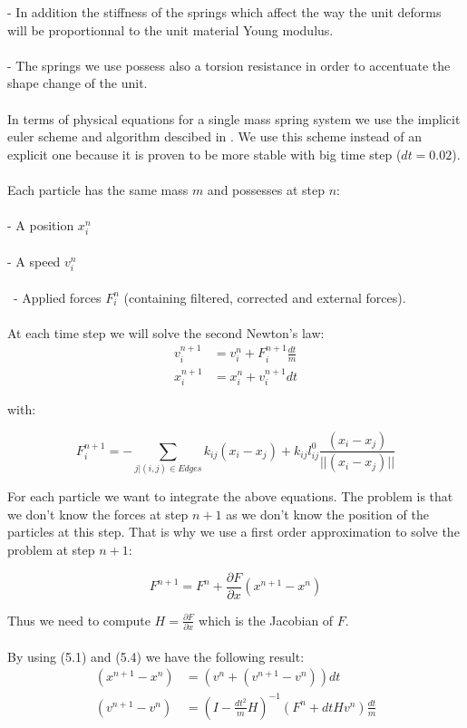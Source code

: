 \documentclass[12pt, a4paper]{report} %
\begin{document}
	\indent	- In addition the stiffness of the springs which affect the way the unit deforms will be proportionnal to the unit material Young modulus. \\\\
\indent	- The springs we use possess also a torsion resistance in order to accentuate the shape change of the unit.\\\\
In terms of physical equations for a single mass spring system we use the implicit euler scheme and algorithm descibed in \cite{caltech}. We use this scheme instead of an explicit one because it is proven to be more stable with big time step ($dt = 0.02$).\\\\ 
Each particle has the same mass $m$ and possesses at step $n$:\\\\
\indent	- A position  $x_i^n$\\\\
\indent	- A speed $v_i^n$ \\\\\
\indent	- Applied forces $F_i^n$ (containing filtered, corrected and external forces).\\\\
At each time step we will solve the second Newton's law:\\

\begin{align}
	v_i^{n+1} &= v_i^n + F_i^{n+1} \frac{dt}{m}\\
	x_i^{n+1} &= x_i^n + v_i^{n+1} dt 
\end{align}

with:

\begin{equation}
F_i^{n+1} = - \sum\limits_{j|(i,j)\in Edges} k_{ij}(x_i - x_j) + k_{ij}l_{ij}^0\frac{(x_i - x_j)}{||(x_i - x_j)||}
\end{equation}


For each particle we want to integrate the above equations. The problem is that we don't know the forces at step $n + 1$ as we don't know the position of the particles at this step. That is why we use a first order approximation to solve the problem at step $n + 1$:

\begin{equation}
	F^{n+1} = F^n + \frac{\partial F}{\partial x}(x^{n+1} - x^n)
\end{equation}

\noindent Thus we need to compute $H =  \frac{\partial F}{\partial x}$ which is the Jacobian of $F$.\\\\
\noindent By using (5.1) and (5.4) we have the following result:
\begin{align*}
	(x^{n+1} - x^n) &= (v^n + (v^{n+1} - v^n))dt \\
	(v^{n+1} - v^n) &= (I - \frac{dt^2}{m}H)^{-1}(F^n + dt H v^n)\frac{dt}{m}
\end{align*}
\end{document}
